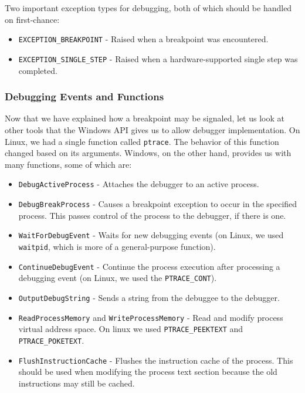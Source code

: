 Two important exception types for debugging, both of which should be handled on
first-chance:
\begin{itemize}
    \item \texttt{EXCEPTION\_BREAKPOINT} - Raised when a breakpoint was encountered.
    \item \texttt{EXCEPTION\_SINGLE\_STEP} - Raised when a hardware-supported
        single step was completed.
\end{itemize}

\subsubsection*{Debugging Events and Functions}
Now that we have explained how a breakpoint may be signaled, let us look at
other tools that the Windows API gives us to allow debugger implementation. On
Linux, we had a single function called \texttt{ptrace}. The behavior of this
function changed based on its arguments. Windows, on the other hand, provides
us with many functions, some of which are:

\begin{itemize}
    \item \texttt{DebugActiveProcess} - Attaches the debugger to an
        active process.
    \item \texttt{DebugBreakProcess} - Causes a breakpoint exception to
        occur in the specified process. This passes control of the process to
        the debugger, if there is one.
    \item \texttt{WaitForDebugEvent} - Waits for new debugging events
        (on Linux, we used \texttt{waitpid}, which is more of a general-purpose
        function).
    \item \texttt{ContinueDebugEvent} - Continue the process execution
        after processing a debugging event (on Linux, we used the
        \texttt{PTRACE\_CONT}).
    \item \texttt{OutputDebugString} - Sends a string from the debuggee
        to the debugger.
    \item \texttt{ReadProcessMemory} and
    \texttt{WriteProcessMemory} - Read and modify process virtual
        address space. On linux we used \texttt{PTRACE\_PEEKTEXT} and
        \texttt{PTRACE\_POKETEXT}.
    \item \texttt{FlushInstructionCache} - Flushes the instruction cache
        of the process. This should be used when modifying the process text
        section because the old instructions may still be cached.
\end{itemize}

